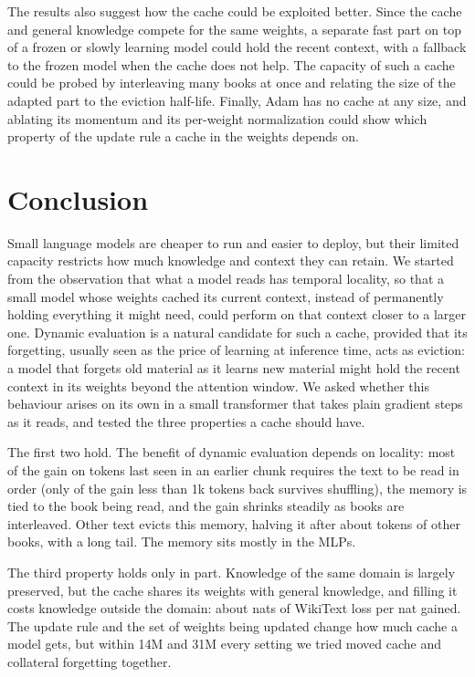 \documentclass[10pt]{article}
\begin{document}
The results also suggest how the cache could be exploited better.
Since the cache and general knowledge compete for the same weights, a separate fast part on top of a frozen or slowly learning model could hold the recent context, with a fallback to the frozen model when the cache does not help.
The capacity of such a cache could be probed by interleaving many books at once and relating the size of the adapted part to the eviction half-life.
Finally, Adam has no cache at any size, and ablating its momentum and its per-weight normalization could show which property of the update rule a cache in the weights depends on.

\section{Conclusion}

Small language models are cheaper to run and easier to deploy, but their limited capacity restricts how much knowledge and context they can retain.
We started from the observation that what a model reads has temporal locality, so that a small model whose weights cached its current context, instead of permanently holding everything it might need, could perform on that context closer to a larger one.
Dynamic evaluation is a natural candidate for such a cache, provided that its forgetting, usually seen as the price of learning at inference time, acts as eviction: a model that forgets old material as it learns new material might hold the recent context in its weights beyond the attention window. 
We asked whether this behaviour arises on its own in a small transformer that takes plain gradient steps as it reads, and tested the three properties a cache should have.

The first two hold.
The benefit of dynamic evaluation depends on locality: most of the gain on tokens last seen in an earlier chunk requires the text to be read in order (only \shuffledShareOneK{} of the gain less than 1k tokens back survives shuffling), the memory is tied to the book being read, and the gain shrinks steadily as books are interleaved.
Other text evicts this memory, halving it after about \evictHalfLife{} tokens of other books, with a long tail.
The memory sits mostly in the MLPs.

The third property holds only in part.
Knowledge of the same domain is largely preserved, but the cache shares its weights with general knowledge, and filling it costs knowledge outside the domain: about \wikiOverGainKOne{} nats of WikiText loss per nat gained.
The update rule and the set of weights being updated change how much cache a model gets, but within 14M and 31M every setting we tried moved cache and collateral forgetting together.
\end{document}
